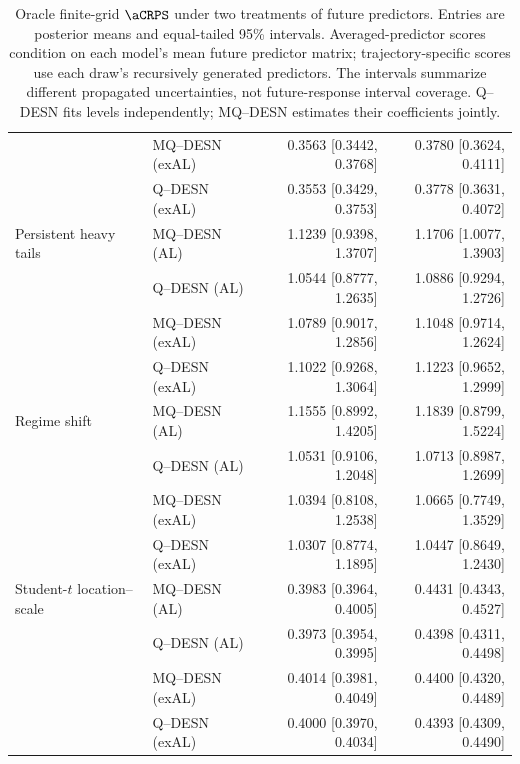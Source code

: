 \begin{table}[p]
\begin{tabular}{@{}>{\raggedright\arraybackslash}p{}lrr@{}}
 & MQ--DESN (exAL) & 0.3563 [0.3442, 0.3768] & 0.3780 [0.3624, 0.4111] \\
 & Q--DESN (exAL) & 0.3553 [0.3429, 0.3753] & 0.3778 [0.3631, 0.4072] \\
\addlinespace[2pt]
Persistent heavy tails & MQ--DESN (AL) & 1.1239 [0.9398, 1.3707] & 1.1706 [1.0077, 1.3903] \\
 & Q--DESN (AL) & 1.0544 [0.8777, 1.2635] & 1.0886 [0.9294, 1.2726] \\
 & MQ--DESN (exAL) & 1.0789 [0.9017, 1.2856] & 1.1048 [0.9714, 1.2624] \\
 & Q--DESN (exAL) & 1.1022 [0.9268, 1.3064] & 1.1223 [0.9652, 1.2999] \\
\addlinespace[2pt]
Regime shift & MQ--DESN (AL) & 1.1555 [0.8992, 1.4205] & 1.1839 [0.8799, 1.5224] \\
 & Q--DESN (AL) & 1.0531 [0.9106, 1.2048] & 1.0713 [0.8987, 1.2699] \\
 & MQ--DESN (exAL) & 1.0394 [0.8108, 1.2538] & 1.0665 [0.7749, 1.3529] \\
 & Q--DESN (exAL) & 1.0307 [0.8774, 1.1895] & 1.0447 [0.8649, 1.2430] \\
\addlinespace[2pt]
Student-\(t\) location--scale & MQ--DESN (AL) & 0.3983 [0.3964, 0.4005] & 0.4431 [0.4343, 0.4527] \\
 & Q--DESN (AL) & 0.3973 [0.3954, 0.3995] & 0.4398 [0.4311, 0.4498] \\
 & MQ--DESN (exAL) & 0.4014 [0.3981, 0.4049] & 0.4400 [0.4320, 0.4489] \\
 & Q--DESN (exAL) & 0.4000 [0.3970, 0.4034] & 0.4393 [0.4309, 0.4490] \\
\bottomrule
\end{tabular}
\caption{Oracle finite-grid \(\aCRPS\) under two treatments of future predictors. Entries are posterior means and equal-tailed 95\% intervals. Averaged-predictor scores condition on each model's mean future predictor matrix; trajectory-specific scores use each draw's recursively generated predictors. The intervals summarize different propagated uncertainties, not future-response interval coverage. Q--DESN fits levels independently; MQ--DESN estimates their coefficients jointly.}
\label{tab:joint-qdesn-pure-desn-v2-recursive-policy}
\end{table}
